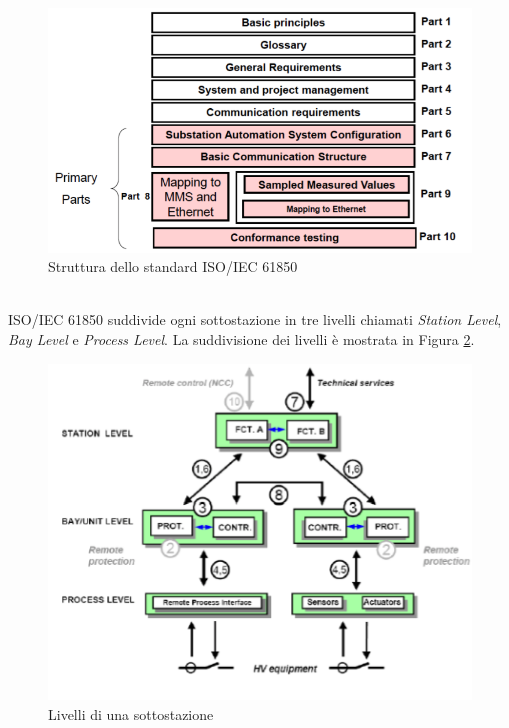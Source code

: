 \begin{figure}[h]
	\centering
	\includegraphics[scale=0.400]{imgs/iec61850.png}
	\caption{Struttura dello standard ISO/IEC 61850} \label{fig:iec61850}
\end{figure}\\
ISO/IEC 61850 suddivide ogni sottostazione in tre livelli\cite{iec61850} chiamati \emph{Station Level}, \emph{Bay Level} e \emph{Process Level}. La suddivisione dei livelli è mostrata in Figura \ref{fig:61850ls}.

\begin{figure}[h]
	\centering
	\includegraphics[scale=0.400]{imgs/61850ls.png}
	\caption{Livelli di una sottostazione} \label{fig:61850ls}
\end{figure}

